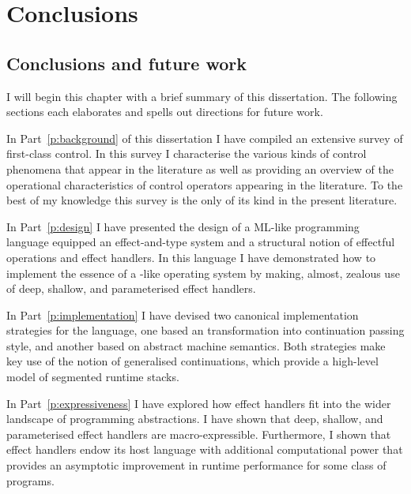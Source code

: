 \documentclass[12pt,phd,lfcs,twoside,openright,logo,leftchapter,normalheadings]{infthesis}
\theoremstyle{plain}
\theoremstyle{definition}
\begin{document}
\part{Conclusions}
\label{p:conclusions}

\chapter{Conclusions and future work}
\label{ch:conclusions}
%
I will begin this chapter with a brief summary of this
dissertation. The following sections each elaborates and spells out
directions for future work.

In Part~\ref{p:background} of this dissertation I have compiled an
extensive survey of first-class control. In this survey I characterise
the various kinds of control phenomena that appear in the literature
as well as providing an overview of the operational characteristics of
control operators appearing in the literature. To the best of my
knowledge this survey is the only of its kind in the present
literature.

In Part~\ref{p:design} I have presented the design of a ML-like
programming language equipped an effect-and-type system and a
structural notion of effectful operations and effect handlers. In this
language I have demonstrated how to implement the essence of a
\UNIX{}-like operating system by making, almost, zealous use of deep,
shallow, and parameterised effect handlers.

In Part~\ref{p:implementation} I have devised two canonical
implementation strategies for the language, one based an
transformation into continuation passing style, and another based on
abstract machine semantics. Both strategies make key use of the notion
of generalised continuations, which provide a high-level model of
segmented runtime stacks.

In Part~\ref{p:expressiveness} I have explored how effect handlers fit
into the wider landscape of programming abstractions. I have shown
that deep, shallow, and parameterised effect handlers are
macro-expressible. Furthermore, I shown that effect handlers endow its
host language with additional computational power that provides an
asymptotic improvement in runtime performance for some class of
programs.
\end{document}
